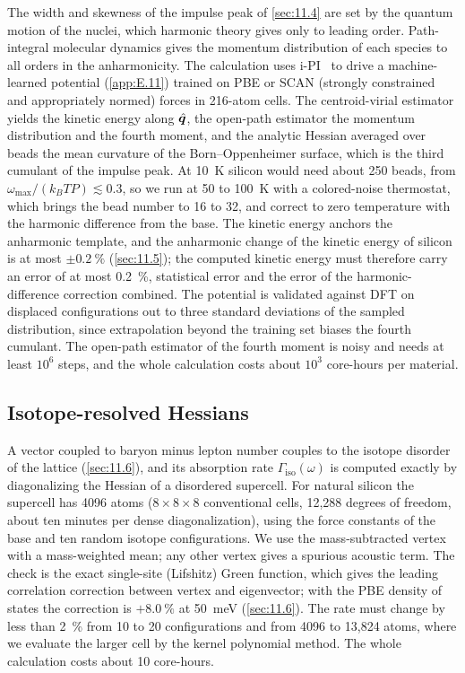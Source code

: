 The width and skewness of the impulse peak of \cref{sec:11.4} are set by the quantum motion of the nuclei, which harmonic theory gives only to leading order. Path-integral molecular dynamics gives the momentum distribution of each species to all orders in the anharmonicity. The calculation uses i-PI~\cite{kapil2019ipi} to drive a machine-learned potential (\cref{app:E.11}) trained on PBE or SCAN (strongly constrained and appropriately normed) forces in 216-atom cells. The centroid-virial estimator yields the kinetic energy along $\hat{\bm{q}}$, the open-path estimator the momentum distribution and the fourth moment, and the analytic Hessian averaged over beads the mean curvature of the Born--Oppenheimer surface, which is the third cumulant of the impulse peak. At \SI{10}{K} silicon would need about 250 beads, from $\omega_{\mathrm{max}}/(k_BTP) \lesssim 0.3$, so we run at 50 to \SI{100}{K} with a colored-noise thermostat, which brings the bead number to 16 to 32, and correct to zero temperature with the harmonic difference from the base. The kinetic energy anchors the anharmonic template, and the anharmonic change of the kinetic energy of silicon is at most $\pm\SI{0.2}{\percent}$ (\cref{sec:11.5}); the computed kinetic energy must therefore carry an error of at most \SI{0.2}{\percent}, statistical error and the error of the harmonic-difference correction combined. The potential is validated against DFT on displaced configurations out to three standard deviations of the sampled distribution, since extrapolation beyond the training set biases the fourth cumulant. The open-path estimator of the fourth moment is noisy and needs at least $10^6$ steps, and the whole calculation costs about $10^3$ core-hours per material.

\subsection{Isotope-resolved Hessians}

A vector coupled to baryon minus lepton number couples to the isotope disorder of the lattice (\cref{sec:11.6}), and its absorption rate $\varGamma_{\mathrm{iso}}(\omega)$ is computed exactly by diagonalizing the Hessian of a disordered supercell. For natural silicon the supercell has 4096 atoms ($8\times8\times8$ conventional cells, 12{,}288 degrees of freedom, about ten minutes per dense diagonalization), using the force constants of the base and ten random isotope configurations. We use the mass-subtracted vertex with a mass-weighted mean; any other vertex gives a spurious acoustic term. The check is the exact single-site (Lifshitz) Green function, which gives the leading correlation correction between vertex and eigenvector; with the PBE density of states the correction is $+\SI{8.0}{\percent}$ at \SI{50}{meV} (\cref{sec:11.6}). The rate must change by less than \SI{2}{\percent} from 10 to 20 configurations and from 4096 to 13{,}824 atoms, where we evaluate the larger cell by the kernel polynomial method. The whole calculation costs about 10 core-hours.

